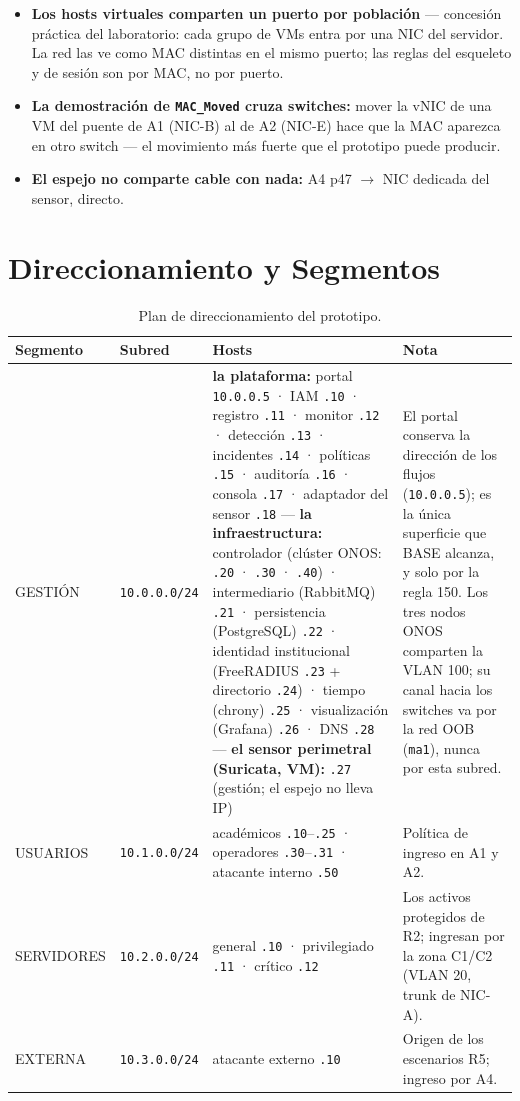 \documentclass[11pt,a4paper]{report}
\begin{document}
\begin{itemize}[leftmargin=*]
\item \textbf{Los hosts virtuales comparten un puerto por población} — concesión práctica del laboratorio: cada grupo de VMs entra por una NIC del servidor. La red las ve como MAC distintas en el mismo puerto; las reglas del esqueleto y de sesión son por MAC, no por puerto.
\item \textbf{La demostración de \texttt{MAC\_Moved} cruza switches:} mover la vNIC de una VM del puente de A1 (NIC-B) al de A2 (NIC-E) hace que la MAC aparezca en otro switch — el movimiento más fuerte que el prototipo puede producir.
\item \textbf{El espejo no comparte cable con nada:} A4 p47 $\rightarrow$ NIC dedicada del sensor, directo.
\end{itemize}

\section{Direccionamiento y Segmentos}
\begin{table}[h!]
\centering
\small
\begin{tabularx}{\linewidth}{p{2.2cm}p{2.4cm}Xp{4.4cm}}
\toprule
\textbf{Segmento} & \textbf{Subred} & \textbf{Hosts} & \textbf{Nota} \\
\midrule
GESTIÓN & \texttt{10.0.0.0/24} & \textbf{la plataforma:} portal \texttt{10.0.0.5} · IAM \texttt{.10} · registro \texttt{.11} · monitor \texttt{.12} · detección \texttt{.13} · incidentes \texttt{.14} · políticas \texttt{.15} · auditoría \texttt{.16} · consola \texttt{.17} · adaptador del sensor \texttt{.18} --- \textbf{la infraestructura:} controlador (clúster ONOS: \texttt{.20} · \texttt{.30} · \texttt{.40}) · intermediario (RabbitMQ) \texttt{.21} · persistencia (PostgreSQL) \texttt{.22} · identidad institucional (FreeRADIUS \texttt{.23} + directorio \texttt{.24}) · tiempo (chrony) \texttt{.25} · visualización (Grafana) \texttt{.26} · DNS \texttt{.28} --- \textbf{el sensor perimetral (Suricata, VM):} \texttt{.27} (gestión; el espejo no lleva IP) & El portal conserva la dirección de los flujos (\texttt{10.0.0.5}); es la única superficie que BASE alcanza, y solo por la regla 150. Los tres nodos ONOS comparten la VLAN 100; su canal hacia los switches va por la red OOB (\texttt{ma1}), nunca por esta subred. \\
USUARIOS & \texttt{10.1.0.0/24} & académicos \texttt{.10}--\texttt{.25} · operadores \texttt{.30}--\texttt{.31} · atacante interno \texttt{.50} & Política de ingreso en A1 y A2. \\
SERVIDORES & \texttt{10.2.0.0/24} & general \texttt{.10} · privilegiado \texttt{.11} · crítico \texttt{.12} & Los activos protegidos de R2; ingresan por la zona C1/C2 (VLAN 20, trunk de NIC-A). \\
EXTERNA & \texttt{10.3.0.0/24} & atacante externo \texttt{.10} & Origen de los escenarios R5; ingreso por A4. \\
\bottomrule
\end{tabularx}
\caption{Plan de direccionamiento del prototipo.}
\label{tab:direccionamiento}
\end{table}
\end{document}
